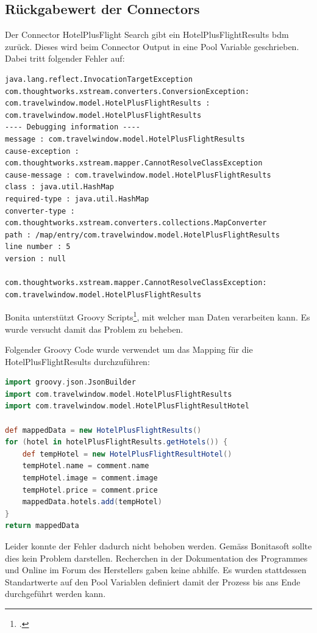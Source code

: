 \subsection{Rückgabewert der Connectors}
Der Connector HotelPlusFlight Search gibt ein HotelPlusFlightResults \gls{bdm} zurück. Dieses wird beim Connector Output in eine Pool Variable geschrieben. Dabei tritt folgender Fehler auf:
\begin{lstlisting}
java.lang.reflect.InvocationTargetException
com.thoughtworks.xstream.converters.ConversionException: com.travelwindow.model.HotelPlusFlightResults : com.travelwindow.model.HotelPlusFlightResults
---- Debugging information ----
message : com.travelwindow.model.HotelPlusFlightResults
cause-exception : com.thoughtworks.xstream.mapper.CannotResolveClassException
cause-message : com.travelwindow.model.HotelPlusFlightResults
class : java.util.HashMap
required-type : java.util.HashMap
converter-type : com.thoughtworks.xstream.converters.collections.MapConverter
path : /map/entry/com.travelwindow.model.HotelPlusFlightResults
line number : 5
version : null

com.thoughtworks.xstream.mapper.CannotResolveClassException: com.travelwindow.model.HotelPlusFlightResults
\end{lstlisting}
Bonita unterstützt Groovy Scripts\footcite{Groovy_2016-06-25}, mit welcher man Daten verarbeiten kann. Es wurde versucht damit das Problem zu beheben.

Folgender Groovy Code wurde verwendet um das Mapping für die HotelPlusFlightResults durchzuführen:
\begin{lstlisting}[language=Groovy,firstnumber=1]
import groovy.json.JsonBuilder
import com.travelwindow.model.HotelPlusFlightResults
import com.travelwindow.model.HotelPlusFlightResultHotel

def mappedData = new HotelPlusFlightResults()
for (hotel in hotelPlusFlightResults.getHotels()) {
	def tempHotel = new HotelPlusFlightResultHotel()
	tempHotel.name = comment.name
	tempHotel.image = comment.image
	tempHotel.price = comment.price
	mappedData.hotels.add(tempHotel)
}
return mappedData
\end{lstlisting}
Leider konnte der Fehler dadurch nicht behoben werden. Gemäss Bonitasoft sollte dies kein Problem darstellen. Recherchen in der Dokumentation des Programmes und Online im Forum des Herstellers gaben keine abhilfe. Es wurden stattdessen Standartwerte auf den Pool Variablen definiert damit der Prozess bis ans Ende durchgeführt werden kann.

